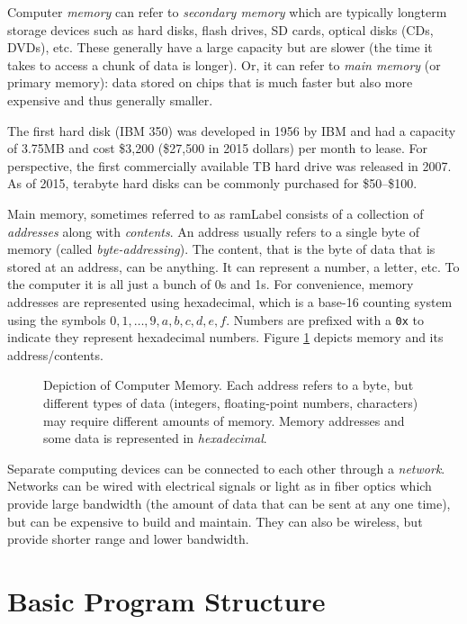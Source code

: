 Computer \emph{memory} can refer to \emph{secondary memory}
which are typically longterm storage devices such as hard disks, flash 
drives, SD cards, optical disks (CDs, DVDs), etc. These generally have
a large capacity but are slower (the time it takes to 
access a chunk of data is longer).  Or, it can refer to \emph{main memory}
(or primary memory): data stored on chips that is much faster but also
more expensive and thus generally smaller.

The first hard disk (IBM 350) was developed in 1956 by IBM and had a capacity of
3.75MB and cost \$3,200 (\$27,500 in 2015 dollars) per month to lease.
For perspective, the first commercially available TB hard drive was released in 2007.
As of 2015, terabyte hard disks can be commonly purchased for \$50--\$100.  

Main memory,  sometimes referred to as \gls{ramLabel} consists of a collection
of \emph{addresses} along with \emph{contents}.  An address usually refers
to a single byte of memory (called \emph{byte-addressing}).  The content, that is the byte of data that is stored at an address,
can be anything.  It can represent a number, a letter, etc.  To the computer
it is all just a bunch of 0s and 1s.  For convenience, memory
addresses are represented using  hexadecimal, which is a base-16 counting
system using the symbols $0, 1, \ldots, 9, a, b, c, d, e, f$.  Numbers
are prefixed with a \texttt{0x} to indicate they represent hexadecimal numbers.
Figure \ref{figure:memory} depicts memory and its address/contents.

\begin{figure}
\centering

\caption[Depiction of Computer Memory]{Depiction of Computer Memory.  
Each address refers to a byte, but different types of data (integers, 
floating-point numbers, characters) may require different amounts of memory.  
Memory addresses and some data is represented in \emph{hexadecimal}.}
\label{figure:memory}
\end{figure}

Separate computing devices can be connected to each other through
a \emph{network}.  Networks can be wired with electrical signals or 
light as in fiber optics which provide large bandwidth 
(the amount of data that can be sent at any one time), but can be expensive to
build and maintain.  They can also be wireless, but provide shorter range
and lower bandwidth.  

\section{Basic Program Structure}

